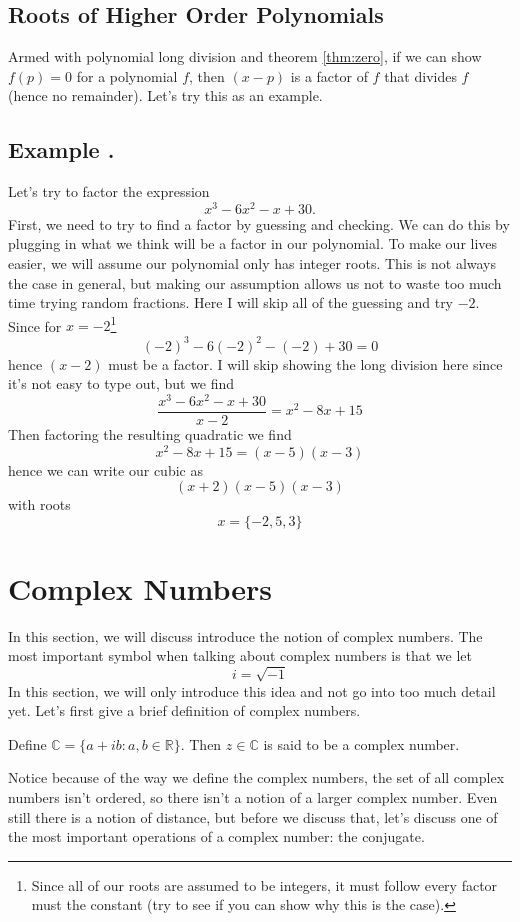 \documentclass[11pt]{article}
\numberwithin{lemma}{section}
\numberwithin{equation}{section}
\numberwithin{define}{section}
\numberwithin{prop}{section}
\numberwithin{figure}{section}
\numberwithin{theorem}{section}
\numberwithin{cor}{section}
\newcounter{ex}[section]
\newenvironment{ex}[0]{

	\refstepcounter{ex}
    \subsection*{Example \theex .}
    }
    {
    \par
    }
\numberwithin{ex}{section}
\def\real{\mathbb{R}}
\def\complex{\mathbb{C}}
\begin{document}
\subsection{Roots of Higher Order Polynomials}
Armed with polynomial long division and theorem \eqref{thm:zero}, if we can show $f(p)=0$ for a polynomial $f$, then $(x-p)$ is a factor of $f$ that divides $f$ (hence no remainder).
Let's try this as an example.

\begin{ex}
	Let's try to factor the expression 
	$$x^3-6x^2-x+30.$$
	First, we need to try to find a factor by guessing and checking. 
	We can do this by plugging in what we think will be a factor in our polynomial. To make our lives easier, we will assume our polynomial only has integer roots.
	This is not always the case in general, but making our assumption allows us not to waste too much time trying random fractions.
	Here I will skip all of the guessing and try $-2$. Since for $x=-2$\footnote{
	Since all of our roots are assumed to be integers, it must follow every factor must the constant (try to see if you can show why this is the case).}
	$$(-2)^3-6(-2)^2-(-2)+30=0$$
	hence $(x-2)$ must be a factor.
	I will skip showing the long division here since it's not easy to type out, but we find
	$$\frac{x^3-6x^2-x+30}{x-2}=x^2-8x+15$$
	Then factoring the resulting quadratic we find
	$$x^2-8x+15=(x-5)(x-3)$$
	hence we can write our cubic as
	$$(x+2)(x-5)(x-3)$$
	with roots
	$$x=\{-2,5,3\}$$
\end{ex}

\section{Complex Numbers}
In this section, we will discuss introduce the notion of complex numbers. The most important symbol when talking about complex numbers is that we let
$$i=\sqrt{-1}$$
In this section, we will only introduce this idea and not go into too much detail yet. Let's first give a brief definition of complex numbers.
\begin{define}
	Define $\complex=\{a+ib:a,b\in\real\}$. Then $z\in\complex$ is said to be a complex number.
\end{define}

Notice because of the way we define the complex numbers, the set of all complex numbers isn't ordered, so there isn't a notion of a larger complex number. Even still there is a notion of distance, but before we discuss that, let's discuss one of the most important operations of a complex number: the conjugate.
\end{document}
